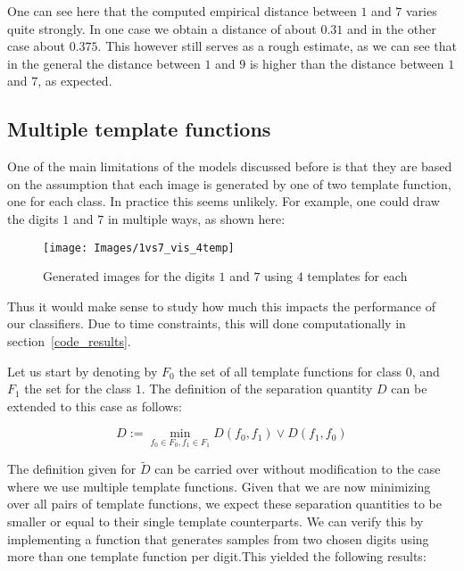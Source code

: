\documentclass{article}
\theoremstyle{definition}
\theoremstyle{remark}
\theoremstyle{proposition}
\begin{document}
            One can see here that the computed empirical distance between $1$ and $7$ varies quite strongly. In one case we obtain a distance of about $0.31$ and in the other case about $0.375$. This however still serves as a rough estimate, as we can see that in the general the distance between $1$ and $9$ is higher than the distance between $1$ and $7$, as expected.

            \subsection{Multiple template functions}

            One of the main limitations of the models discussed before is that they are based on the assumption that each image is generated by one of two template function, one for each class. In practice this seems unlikely. For example, one could draw the digits $1$ and $7$ in multiple ways, as shown here:

            \begin{figure}[H]
                \centering
                \texttt{[image: Images/1vs7\_vis\_4temp]}
                \caption{Generated images for the digits $1$ and $7$ using $4$ templates for each}
                \label{1vs9_vis_4t}
            \end{figure}

            Thus it would make sense to study how much this impacts the performance of our classifiers. Due to time constraints, this will done computationally in section~\ref{code_results}. 
            
            Let us start by denoting by $F_0$ the set of all template functions for class $0$, and $F_1$ the set for the class $1$. The definition of the separation quantity $D$ can be extended to this case as follows:
            
            \[
                D := \min_{f_0 \in F_0,f_1 \in F_1} D(f_0,f_1) \vee D(f_1,f_0)
            \]

            The definition given for $\tilde{D}$ can be carried over without modification to the case where we use multiple template functions.
            Given that we are now minimizing over all pairs of template functions, we expect these separation quantities to be smaller or equal to their single template counterparts. We can verify this by implementing a function that generates samples from two chosen digits using more than one template function per digit.This yielded the following results:
            
\end{document}
